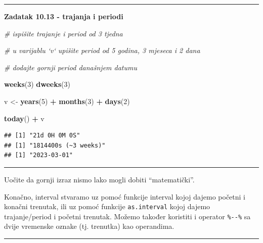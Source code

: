 \documentclass[]{book}
\newenvironment{Shaded}{\begin{snugshade}}{\end{snugshade}}
\newcommand{\KeywordTok}[1]{\textcolor[rgb]{0.13,0.29,0.53}{\textbf{#1}}}
\newcommand{\DecValTok}[1]{\textcolor[rgb]{0.00,0.00,0.81}{#1}}
\newcommand{\StringTok}[1]{\textcolor[rgb]{0.31,0.60,0.02}{#1}}
\newcommand{\CommentTok}[1]{\textcolor[rgb]{0.56,0.35,0.01}{\textit{#1}}}
\newcommand{\OperatorTok}[1]{\textcolor[rgb]{0.81,0.36,0.00}{\textbf{#1}}}
\newcommand{\NormalTok}[1]{#1}
\theoremstyle{definition}
\theoremstyle{definition}
\theoremstyle{definition}
\theoremstyle{remark}
\begin{document}
\begin{center}\rule{0.5\linewidth}{\linethickness}\end{center}

\textbf{Zadatak 10.13 - trajanja i periodi}

\begin{Shaded}
\begin{Highlighting}[]
\CommentTok{# ispišite trajanje i period od 3 tjedna}

\CommentTok{# u varijablu `v` upišite period od 5 godina, 3 mjeseca i 2 dana}

\CommentTok{# dodajte gornji period današnjem datumu}
\end{Highlighting}
\end{Shaded}

\begin{Shaded}
\begin{Highlighting}[]
\KeywordTok{weeks}\NormalTok{(}\DecValTok{3}\NormalTok{)}
\KeywordTok{dweeks}\NormalTok{(}\DecValTok{3}\NormalTok{)}

\NormalTok{v <-}\StringTok{ }\KeywordTok{years}\NormalTok{(}\DecValTok{5}\NormalTok{) }\OperatorTok{+}\StringTok{ }\KeywordTok{months}\NormalTok{(}\DecValTok{3}\NormalTok{) }\OperatorTok{+}\StringTok{ }\KeywordTok{days}\NormalTok{(}\DecValTok{2}\NormalTok{)}

\KeywordTok{today}\NormalTok{() }\OperatorTok{+}\StringTok{ }\NormalTok{v}
\end{Highlighting}
\end{Shaded}

\begin{verbatim}
## [1] "21d 0H 0M 0S"
## [1] "1814400s (~3 weeks)"
## [1] "2023-03-01"
\end{verbatim}

\begin{center}\rule{0.5\linewidth}{\linethickness}\end{center}

Uočite da gornji izraz nismo lako mogli dobiti ``matematički''.

Konačno, interval stvaramo uz pomoć funkcije interval kojoj dajemo
početni i konačni trenutak, ili uz pomoć funkcije \texttt{as.interval}
kojoj dajemo trajanje/period i početni trenutak. Možemo također
koristiti i operator \texttt{\%-\/-\%} sa dvije vremenske oznake (tj.
trenutka) kao operandima.

\begin{center}\rule{0.5\linewidth}{\linethickness}\end{center}
\end{document}

